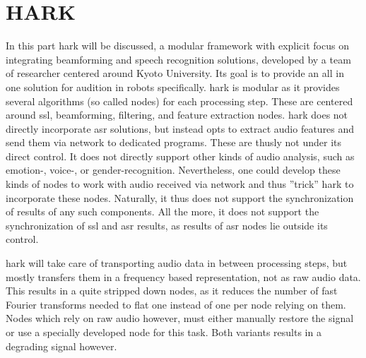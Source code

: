 
\section{HARK}
\label{related:frameworks}
In this part \gls{hark} \cite{Nakadai_2017jrm} will be discussed, a modular framework with explicit focus on integrating beamforming and speech recognition solutions, developed by a team of researcher centered around Kyoto University.
Its goal is to provide an all in one solution for audition in robots specifically.
\gls{hark} is modular as it provides several algorithms (so called nodes) for each processing step.
These are centered around \gls{ssl}, beamforming, filtering, and feature extraction nodes.
\gls{hark} does not directly incorporate \gls{asr} solutions, but instead opts to extract audio features and send them via network to dedicated programs.
These are thusly not under its direct control.
It does not directly support other kinds of audio analysis, such as emotion-, voice-, or gender-recognition.
Nevertheless, one could develop these kinds of nodes to work with audio received via network and thus ''trick'' \gls{hark} to incorporate these nodes.
Naturally, it thus does not support the synchronization of results of any such components.
All the more, it does not support the synchronization of \gls{ssl} and \gls{asr} results, as results of \gls{asr} nodes lie outside its control.

\gls{hark} will take care of transporting audio data in between processing steps, but mostly transfers them in a frequency based representation, not as raw audio data.
This results in a quite stripped down nodes, as it reduces the number of fast Fourier transforms needed to flat one instead of one per node relying on them.
Nodes which rely on raw audio however, must either manually restore the signal or use a specially developed node for this task.
Both variants results in a degrading signal however.

